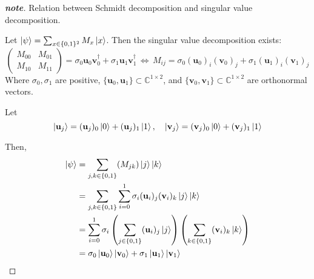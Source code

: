 \documentclass[a4paper,11pt]{article}
\newenvironment{note}
  {\renewcommand\qedsymbol{$\blacksquare$}\begin{proof}[\textnormal{\textbf{note}}]}
  {\end{proof}}
\begin{document}
\begin{note}
    Relation between Schmidt decomposition and singular value decomposition.

    Let $\ket\psi=\sum_{x\in\{0, 1\}^2} M_x\ket{x}$.
    Then the singular value decomposition exists:
    \begin{equation}
        \begin{pmatrix}
            M_{00} & M_{01} \\
            M_{10} & M_{11}
        \end{pmatrix}=
        \sigma_0 \mathbf u_0\mathbf v_0^\dagger + \sigma_1 \mathbf u_1\mathbf v_1^\dagger \,\Leftrightarrow\, M_{ij}=\sigma_0(\mathbf u_0)_i(\mathbf v_0)_j+\sigma_1(\mathbf u_1)_i(\mathbf v_1)_j
    \end{equation}
    Where $\sigma_0, \sigma_1$ are positive, $\{\mathbf u_0, \mathbf u_1\}\subset\mathbb C^{1\times2}$, and $\{\mathbf v_0, \mathbf v_1\}\subset\mathbb C^{1\times2}$ are orthonormal vectors.
    
    Let
    \begin{equation}
        \ket{\mathbf u_j}=(\mathbf u_j)_0\ket{0}+(\mathbf u_j)_1\ket{1},\quad \ket{\mathbf v_j}=(\mathbf v_j)_0\ket{0}+(\mathbf v_j)_1\ket{1}\label{eqn:uvket}
    \end{equation}

    Then,
    \begin{align}
        \ket\psi
        &= \sum_{j, k\in\{0, 1\}}(M_{jk})\ket{j}\ket{k}\\
        &= \sum_{j, k\in\{0, 1\}}\sum_{i=0}^1\sigma_i(\mathbf u_i)_j(\mathbf v_i)_k\ket{j}\ket{k}\\
        &= \sum_{i=0}^1\sigma_i\left(\sum_{j\in\{0, 1\}}(\mathbf u_i)_j\ket{j}\right)\left(\sum_{k\in\{0, 1\}}(\mathbf v_i)_k\ket{k}\right)\\
        &=\sigma_0\ket{\mathbf u_0}\ket{\mathbf v_0}+\sigma_1\ket{\mathbf u_1}\ket{\mathbf v_1}
    \end{align}
\end{note}
\end{document}
